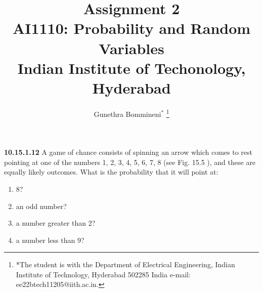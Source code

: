 \documentclass[journal,12pt,twocolumn]{IEEEtran}
\begin{document}
\let\vec\mathbf

\vspace{3cm}

\title{
\textbf {Assignment 2}\\ \large \textbf{AI1110}: Probability and Random Variables\\Indian Institute of Techonology, Hyderabad
}
\author{Gunethra Bommineni$^{*}$%
	\thanks{*The student is with the Department
		of Electrical Engineering, Indian Institute of Technology, Hyderabad
		502285 India e-mail: ee22btech11205@iith.ac.in.}
  }

\maketitle

\newpage


\bigskip
\renewcommand{\thefigure}{\theenumi}
\renewcommand{\thetable}{\theenumi}
\textbf{10.15.1.12}
A game of chance consists of spinning an arrow
which comes to rest pointing at one of the numbers
1, 2, 3, 4, 5, 6, 7, 8 (see Fig. 15.5 ), and these are equally
likely outcomes. What is the probability that it will
point at:
\begin{enumerate}[label=(\roman*)]
\item 
8?
\item 
an odd number?
\item 
a number greater than 2?
\item 
a number less than 9?
\end{enumerate}
\end{document}
